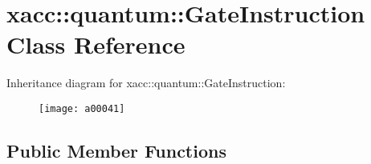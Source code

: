 \hypertarget{a00041}{}\section{xacc\+:\+:quantum\+:\+:Gate\+Instruction Class Reference}
\label{a00041}
Inheritance diagram for xacc\+:\+:quantum\+:\+:Gate\+Instruction\+:\begin{figure}[H]
\begin{center}
\leavevmode
\texttt{[image: a00041]}
\end{center}
\end{figure}
\subsection*{Public Member Functions}
